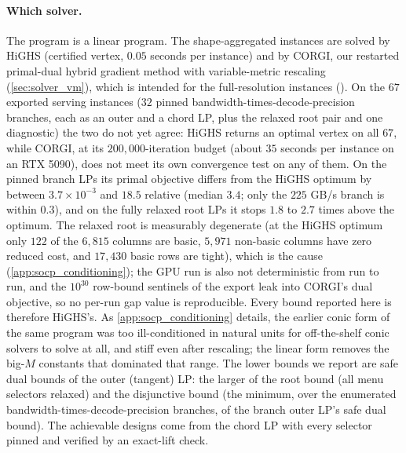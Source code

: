 \paragraph{Which solver.}
The program is a linear program. The shape-aggregated instances are solved by
HiGHS (certified vertex, $0.05$ seconds per instance) and by CORGI, our
restarted primal-dual hybrid gradient method with variable-metric rescaling
(\cref{sec:solver_vm}), which is intended for the full-resolution instances
(). On the $67$
exported serving instances ($32$ pinned
bandwidth-times-decode-precision branches, each as an outer and a chord LP,
plus the relaxed root pair and one diagnostic) the two do not yet agree: HiGHS
returns an optimal vertex on all $67$, while CORGI, at its $200{,}000$-iteration
budget (about $35$ seconds per instance on an RTX 5090), does not meet its own
convergence test on any of them. On the pinned branch LPs its primal objective
differs from the HiGHS optimum by between $3.7\times10^{-3}$ and $18.5$
relative (median $3.4$; only the $225$ GB/s branch is within $0.3$), and on the
fully relaxed root LPs it stops $1.8$ to $2.7$ times above the optimum. The
relaxed root is measurably degenerate (at the HiGHS optimum only $122$ of the
$6{,}815$ columns are basic, $5{,}971$ non-basic columns have zero reduced
cost, and $17{,}430$ basic rows are tight), which is the cause
(\cref{app:socp_conditioning}); the GPU run is also not deterministic
from run to run, and the $10^{30}$ row-bound sentinels of the export leak into
CORGI's dual objective, so no per-run gap value is reproducible. Every bound
reported here is therefore HiGHS's.
As \cref{app:socp_conditioning} details, the earlier conic form of the same
program was too ill-conditioned in natural units for off-the-shelf conic solvers
to solve at all, and stiff even after rescaling; the linear form removes the
big-$M$ constants that dominated that range. The lower bounds we report are
safe dual bounds of the outer (tangent) LP: the larger of the root bound (all
menu selectors relaxed) and the disjunctive bound (the minimum, over the
enumerated bandwidth-times-decode-precision branches, of the branch outer LP's
safe dual bound). The achievable designs come from the chord LP with every
selector pinned and verified by an exact-lift check.

